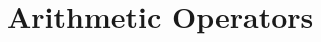 \documentclass[../lecture2-variables.tex]{subfiles}
\begin{document}
\section{Arithmetic Operators}


\begin{frame}[fragile]{}



\end{frame}


\begin{frame}[fragile]{}



\end{frame}


\begin{frame}[fragile]{}



\end{frame}

\end{document}
